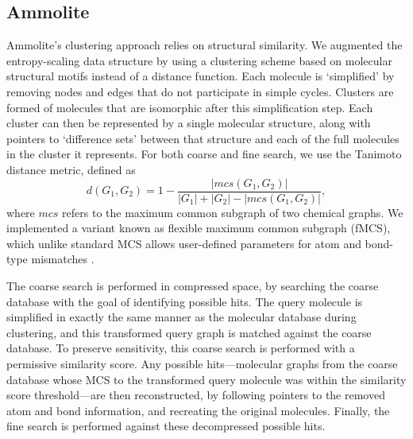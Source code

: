 \documentclass[review,preprint,12pt]{elsarticle}
\renewcommand{\cite}{\citep} %
\theoremstyle{definition}
\theoremstyle{remark}
\numberwithin{equation}{section}
\begin{document}
\subsection{Ammolite}
Ammolite's clustering approach relies on structural similarity.
We augmented the entropy-scaling data structure by using a clustering scheme based on molecular structural motifs instead of a distance function.
Each molecule is `simplified' by removing nodes and edges that do not
participate in simple cycles.
Clusters are formed of molecules that are isomorphic after this simplification
step.
Each cluster can then be represented by a single molecular structure, along 
with pointers to `difference sets'  between that structure and each of the 
full molecules in the cluster it represents.
For both coarse and fine search, we use the Tanimoto distance metric, defined as
\[d(G_1,G_2) = 1 - \frac{ |mcs(G_1,G_2)| }{|G_1|+|G_2|-|mcs(G_1,G_2)|},\]
where $mcs$ refers to the maximum common subgraph of two chemical graphs. 
We implemented a variant known as 
flexible maximum common subgraph (fMCS), which unlike standard MCS allows user-defined parameters for atom and bond-type mismatches \cite{cao2008maximum}.

The coarse search is performed in compressed space, by searching 
the coarse database with the goal of identifying possible hits.
The query molecule is simplified in exactly the same manner as 
the molecular database during clustering, and this transformed query graph is 
matched against the coarse database.
To preserve sensitivity, this coarse search is performed with a permissive 
similarity score.
Any possible hits---molecular graphs from the coarse database whose MCS to 
the transformed query molecule was within the similarity score threshold---are 
then reconstructed, by following
pointers to the removed atom and bond information, and recreating the 
original molecules.
Finally, the fine search is performed against these decompressed possible 
hits.
\end{document}
